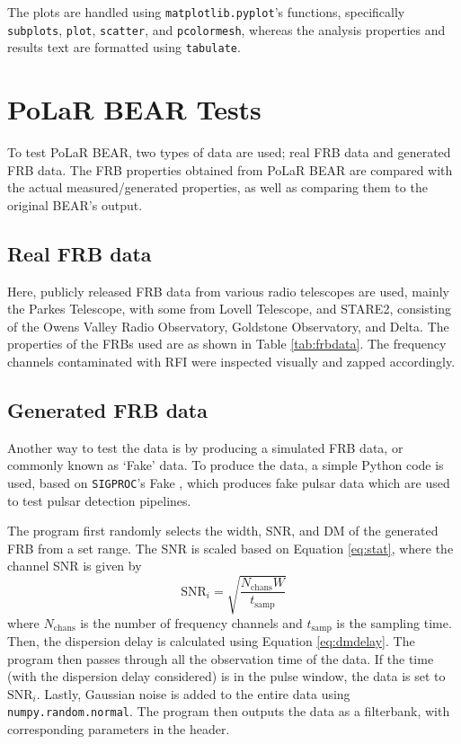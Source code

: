 The plots are handled using \texttt{matplotlib.pyplot}'s functions, specifically \texttt{subplots}, \texttt{plot}, \texttt{scatter}, and \texttt{pcolormesh}, whereas the analysis properties and results text are formatted using \texttt{tabulate}. %
\pagebreak

\section{PoLaR BEAR Tests}

To test PoLaR BEAR, two types of data are used; real FRB data and generated FRB data. The FRB properties obtained from PoLaR BEAR are compared with the actual measured/generated properties, as well as comparing them to the original BEAR's output. 

\subsection{Real FRB data}

Here, publicly released FRB data from various radio telescopes are used, mainly the Parkes Telescope, with some from Lovell Telescope, and STARE2, consisting of the Owens Valley Radio Observatory, Goldstone Observatory, and Delta. The properties of the FRBs used are as shown in Table \ref{tab:frbdata}. The frequency channels contaminated with RFI were inspected visually and zapped accordingly.



\subsection{Generated FRB data}

Another way to test the data is by producing a simulated FRB data, or commonly known as `Fake' data. To produce the data, a simple Python code is used, based on \texttt{SIGPROC}'s Fake \cite{Lorimersigproc}, which produces fake pulsar data which are used to test pulsar detection pipelines. 

The program first randomly selects the width, SNR, and DM of the generated FRB from a set range. The SNR is scaled based on Equation \ref{eq:stat}, where the channel SNR is given by 
\begin{equation}
    \text{SNR}_i = \sqrt{\frac{N_{\text{chans}}W}{t_{\text{samp}}}}
\end{equation} 
where $N_{\text{chans}}$ is the number of frequency channels and $t_{\text{samp}}$ is the sampling time. Then, the dispersion delay is calculated using Equation \ref{eq:dmdelay}. The program then passes through all the observation time of the data. If the time (with the dispersion delay considered) is in the pulse window, the data is set to $\text{SNR}_i$. Lastly, Gaussian noise is added to the entire data using \texttt{numpy.random.normal}. The program then outputs the data as a filterbank, with corresponding parameters in the header. 

